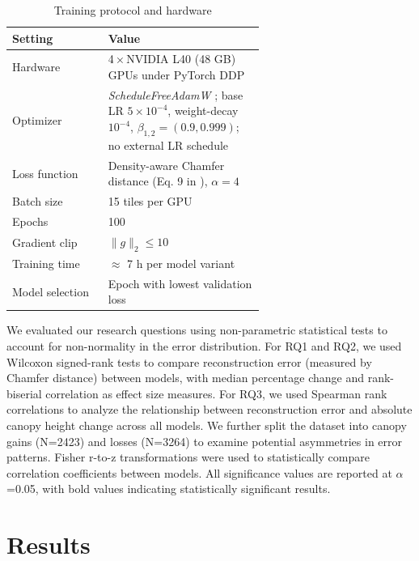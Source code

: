 \documentclass[remotesensing,article,submit,pdftex,moreauthors]{Definitions/mdpi}
\begin{document}
\begin{table}[htbp]
  \centering
  \caption{Training protocol and hardware}
  \label{tab:training_protocol}
  \begin{tabular}{lp{0.62\linewidth}}
    \toprule
    \textbf{Setting} & \textbf{Value} \\
    \midrule
    Hardware      & 4\,×\,NVIDIA L40 (48 GB) GPUs under PyTorch DDP \\
    Optimizer     & \textit{ScheduleFreeAdamW} \cite{defazio_road_2024}; base LR $5\times10^{-4}$, weight-decay $10^{-4}$, $\beta_{1,2}=(0.9,0.999)$; no external LR schedule \\
    Loss function & Density-aware Chamfer distance (Eq. 9 in \cite{wu_density-aware_2021}), $\alpha=4$ \\
    Batch size    & 15 tiles per GPU \\
    Epochs        & 100 \\
    Gradient clip & $\lVert g\rVert_2 \le 10$ \\
    Training time & $\approx$ 7 h per model variant \\
    Model selection & Epoch with lowest validation loss \\
    \bottomrule
  \end{tabular}
\end{table}

We evaluated our research questions using non-parametric statistical tests to account for non-normality in the error distribution. For RQ1 and RQ2, we used Wilcoxon signed-rank tests to compare reconstruction error (measured by Chamfer distance) between models, with median percentage change and rank-biserial correlation as effect size measures. For RQ3, we used Spearman rank correlations to analyze the relationship between reconstruction error and absolute canopy height change across all models. We further split the dataset into canopy gains (N=2423) and losses (N=3264) to examine potential asymmetries in error patterns. Fisher r-to-z transformations were used to statistically compare correlation coefficients between models. All significance values are reported at $\alpha$=0.05, with bold values indicating statistically significant results.

\section{Results}
\end{document}
